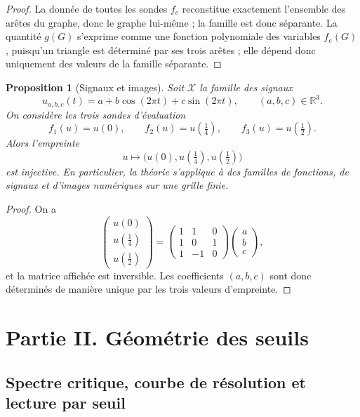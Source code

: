 \documentclass[11pt,a4paper,openany]{book}
\newtheorem{proposition}[definition]{Proposition}
\begin{document}
\begin{proof}
La donnée de toutes les sondes \(f_e\) reconstitue exactement l'ensemble des arêtes du graphe, donc le graphe lui-même ; la famille est donc séparante. La quantité \(g(G)\) s'exprime comme une fonction polynomiale des variables \(f_e(G)\), puisqu'un triangle est déterminé par ses trois arêtes ; elle dépend donc uniquement des valeurs de la famille séparante.
\end{proof}

\begin{proposition}[Signaux et images]
Soit \(\mathcal X\) la famille des signaux
\[
u_{a,b,c}(t)=a+b\cos(2\pi t)+c\sin(2\pi t),
\qquad (a,b,c)\in\mathbb R^3.
\]
On considère les trois sondes d'évaluation
\[
f_1(u)=u(0),\qquad f_2(u)=u\!\left(\tfrac14\right),\qquad f_3(u)=u\!\left(\tfrac12\right).
\]
Alors l'empreinte
\[
u\longmapsto \bigl(u(0),u(\tfrac14),u(\tfrac12)\bigr)
\]
est injective. En particulier, la théorie s'applique à des familles de fonctions, de signaux et d'images numériques sur une grille finie.
\end{proposition}

\begin{proof}
On a
\[
\begin{pmatrix}
u(0)\\[0.2em]
u\!\left(\tfrac14\right)\\[0.2em]
u\!\left(\tfrac12\right)
\end{pmatrix}
=
\begin{pmatrix}
1&1&0\\
1&0&1\\
1&-1&0
\end{pmatrix}
\begin{pmatrix}
a\\b\\c
\end{pmatrix},
\]
et la matrice affichée est inversible. Les coefficients \((a,b,c)\) sont donc déterminés de manière unique par les trois valeurs d'empreinte.
\end{proof}

\section{Partie II. Géométrie des seuils}

\subsection{Spectre critique, courbe de résolution et lecture par seuil}
\end{document}
